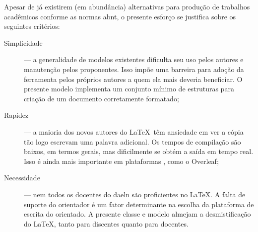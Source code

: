 Apesar de já existirem (em abundância) alternativas para produção de trabalhos acadêmicos conforme as normas \ac{abnt}, o presente esforço se justifica sobre os seguintes critérios:
\begin{description}
	\item[Simplicidade] --- a generalidade de modelos existentes dificulta seu uso pelos autores e manutenção pelos proponentes. Isso impõe uma barreira para adoção da ferramenta pelos próprios autores a quem ela mais deveria beneficiar. O presente modelo implementa um conjunto mínimo de estruturas para criação de um documento corretamente formatado;
	\item[Rapidez] --- a maioria dos novos autores do \LaTeX\ têm ansiedade em ver a cópia tão logo escrevam uma palavra adicional. Os tempos de compilação são baixos, em termos gerais, mas dificilmente se obtém a saída em tempo real. Isso é ainda mais importante em plataformas , como o Overleaf;
	\item[Necessidade] --- nem todos os docentes do \ac{daeln} são proficientes no \LaTeX. A falta de suporte do orientador é um fator determinante na escolha da plataforma de escrita do orientado. A presente classe e modelo almejam a desmistificação do \LaTeX, tanto para discentes quanto para docentes.
\end{description}

